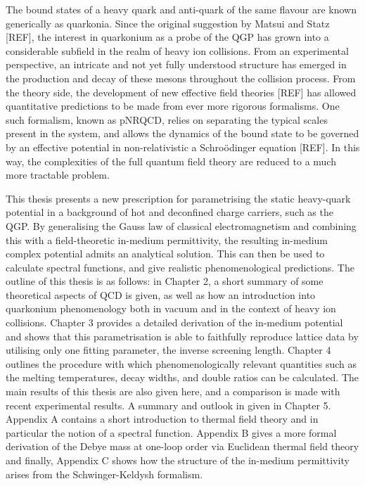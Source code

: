 \documentclass[12pt, a4paper, twoside]{book}
\begin{document}
The bound states of a heavy quark and anti-quark of the same flavour are known generically as quarkonia. Since the original suggestion by Matsui and Statz [REF], the interest in quarkonium as a probe of the QGP has grown into a considerable subfield in the realm of heavy ion collisions. From an experimental perspective, an intricate and not yet fully understood structure has emerged in the production and decay of these mesons throughout the collision process. From the theory side, the development of new effective field theories [REF] has allowed quantitative predictions to be made from ever more rigorous formalisms. One such formalism, known as pNRQCD, relies on separating the typical scales present in the system, and allows the dynamics of the bound state to be governed by an effective potential in non-relativistic a Schro{\"o}dinger equation [REF]. In this way, the complexities of the full quantum field theory are reduced to a much more tractable problem.

This thesis presents a new prescription for parametrising the static heavy-quark potential in a background of hot and deconfined charge carriers, such as the QGP. By generalising the Gauss law of classical electromagnetism and combining this with a field-theoretic in-medium permittivity, the resulting in-medium complex potential admits an analytical solution. This can then be used to calculate spectral functions, and give realistic phenomenological predictions. The outline of this thesis is as follows: in Chapter 2, a short summary of some theoretical aspects of QCD is given, as well as how an introduction into quarkonium phenomenology both in vacuum and in the context of heavy ion collisions. Chapter 3 provides a detailed derivation of the in-medium potential and shows that this parametrisation is able to faithfully reproduce lattice data by utilising only one fitting parameter, the inverse screening length. Chapter 4 outlines the procedure with which phenomenologically relevant quantities such as the melting temperatures, decay widths, and double ratios can be calculated. The main results of this thesis are also given here, and a comparison is made with recent experimental results. A summary and outlook in given in Chapter 5. Appendix A contains a short introduction to thermal field theory and in particular the notion of a spectral function. Appendix B gives a more formal derivation of the Debye mass at one-loop order via Euclidean thermal field theory and finally, Appendix C shows how the structure of the in-medium permittivity arises from the Schwinger-Keldysh formalism. 
\end{document}
